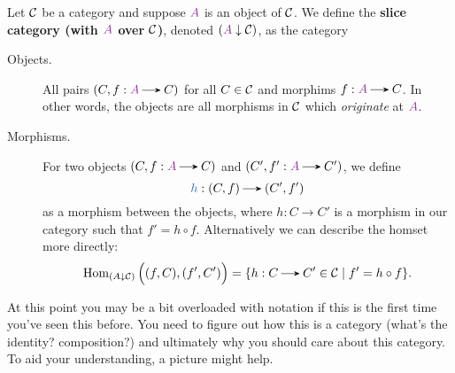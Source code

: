     \begin{definition}
        Let $\mathcal{C}$ be a category and suppose $\textcolor{Purple}{A}$ is an object of $\mathcal{C}$.
        We define the \textbf{slice category (with $\textcolor{Purple}{A}$ over $\mathcal{C}$)}, 
        denoted $(\textcolor{Purple}{A} \downarrow\cc)$, as the category 

        \begin{description}
            \item[Objects.] All pairs $(C, f: \textcolor{Purple}{A} \to C)$ 
            for all $C \in  \mathcal{C}$  and morphims $f:\textcolor{Purple}{A} \to C$.
            In other words, the objects are all morphisms in $\mathcal{C}$ which \emph{originate}
            at $\textcolor{Purple}{A}$. 

            \item[Morphisms.]
            For two objects $(C, f:\textcolor{Purple}{A}\to C)$ and $(C', f': \textcolor{Purple}{A} \to C')$, 
            we define 
            \[
                \textcolor{NavyBlue}{h} : (C, f) \to (C', f')
            \]
            as a morphism between the objects, where $h: C \to C'$ is a morphism in 
            our category such that $f' = h \circ f$. Alternatively we can describe 
            the homset more directly:
            \[
                \hom_{(A\downarrow \cc)}\Big( (f, C), (f', C')\Big)
                =
                \{ h: C \to C' \in \cc \mid f' = h \circ f \}.
            \]
        \end{description}
    \end{definition}
    At this point you may be a bit overloaded with notation if this is the first 
    time you've seen this before. You need to figure out how this is a category (what's the identity? composition?)
    and ultimately why you should care about this category.
    To aid your understanding, a picture might help.

